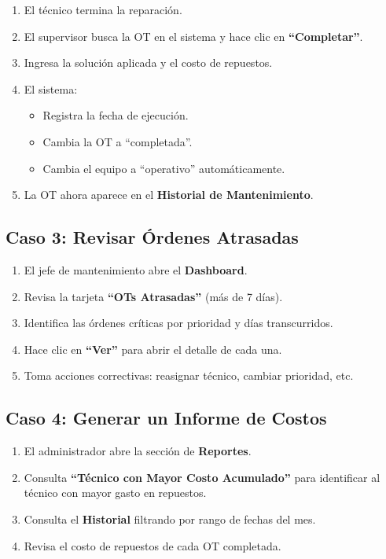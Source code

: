 \documentclass[12pt, a4paper]{article}
\begin{document}
\begin{enumerate}[leftmargin=2em]
    \item El t\'ecnico termina la reparaci\'on.
    \item El supervisor busca la OT en el sistema y hace clic en \textbf{``Completar''}.
    \item Ingresa la soluci\'on aplicada y el costo de repuestos.
    \item El sistema:
    \begin{itemize}
        \item Registra la fecha de ejecuci\'on.
        \item Cambia la OT a ``completada''.
        \item Cambia el equipo a ``operativo'' autom\'aticamente.
    \end{itemize}
    \item La OT ahora aparece en el \textbf{Historial de Mantenimiento}.
\end{enumerate}

\subsection{Caso 3: Revisar \'Ordenes Atrasadas}

\begin{enumerate}[leftmargin=2em]
    \item El jefe de mantenimiento abre el \textbf{Dashboard}.
    \item Revisa la tarjeta \textbf{``OTs Atrasadas''} (m\'as de 7 d\'ias).
    \item Identifica las \'ordenes cr\'iticas por prioridad y d\'ias transcurridos.
    \item Hace clic en \textbf{``Ver''} para abrir el detalle de cada una.
    \item Toma acciones correctivas: reasignar t\'ecnico, cambiar prioridad, etc.
\end{enumerate}

\subsection{Caso 4: Generar un Informe de Costos}

\begin{enumerate}[leftmargin=2em]
    \item El administrador abre la secci\'on de \textbf{Reportes}.
    \item Consulta \textbf{``T\'ecnico con Mayor Costo Acumulado''} para identificar al t\'ecnico con mayor gasto en repuestos.
    \item Consulta el \textbf{Historial} filtrando por rango de fechas del mes.
    \item Revisa el costo de repuestos de cada OT completada.
\end{enumerate}
\end{document}
